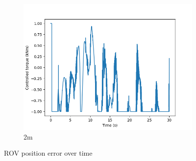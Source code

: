 \documentclass[class=article, crop=false]{standalone}
\begin{document}
\begin{figure}
\begin{subfigure}[b]{0.48\textwidth}
        \includegraphics{scenario1/rov-50m/2.0m/usv_torque}
        \caption{2m}
        \label{}
    \end{subfigure}

    \caption{ROV position error over time}
\end{figure}
\end{document}
